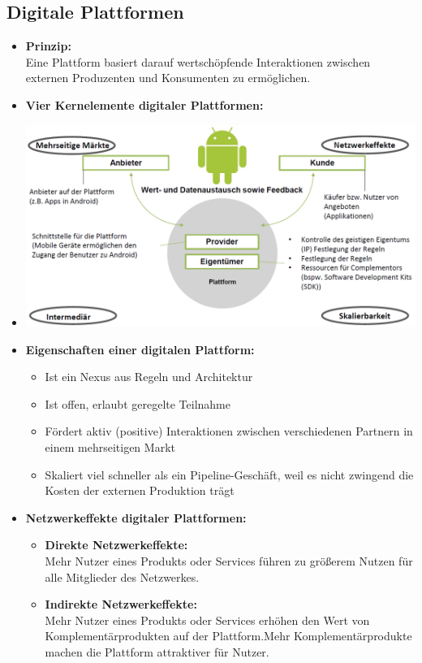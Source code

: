 \documentclass[12pt,a4paper]{article}
\begin{document}
\vspace{1cm}
\subsection{Digitale Plattformen} %
\begin{itemize}
   \item \textbf{Prinzip:}\\
         Eine Plattform basiert darauf wertschöpfende Interaktionen zwischen externen Produzenten und Konsumenten zu ermöglichen.
   
   
   \newpage
   \item \textbf{Vier Kernelemente digitaler Plattformen:}
   \item[] \includegraphics[scale=0.42]{VierKernelemente.png}
   
   \item \textbf{Eigenschaften einer digitalen Plattform:}
         \begin{itemize}
            \item Ist ein Nexus aus Regeln und Architektur
            \item Ist offen, erlaubt geregelte Teilnahme
            \item Fördert aktiv (positive) Interaktionen zwischen verschiedenen Partnern in einem mehrseitigen Markt
            \item Skaliert viel schneller als ein Pipeline-Geschäft, weil es nicht zwingend die Kosten der externen Produktion trägt
         \end{itemize}
   
   \item \textbf{Netzwerkeffekte digitaler Plattformen:}
         \begin{itemize}
            \item \textbf{Direkte Netzwerkeffekte:}\\
                  Mehr Nutzer eines Produkts oder Services führen zu größerem Nutzen für alle Mitglieder des Netzwerkes.
            \item \textbf{Indirekte Netzwerkeffekte:}\\
                  Mehr Nutzer eines Produkts oder Services erhöhen den Wert von Komplementärprodukten auf der Plattform.Mehr Komplementärprodukte machen die Plattform attraktiver für Nutzer.
         \end{itemize}
   

\end{itemize}
\end{document}
